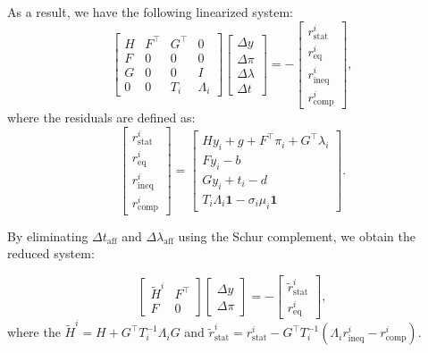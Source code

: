 \documentclass[conference]{IEEEtran}
\theoremstyle{plain}
\begin{document}
As a result, we have the following linearized system:
	\begin{equation}
		\begin{bmatrix}
		H & F^\top & G^\top & 0\\
		F & 0 & 0 & 0 \\
		G & 0 & 0 & I \\
		0 & 0 & T_i & \Lambda_i
		\end{bmatrix}
		\begin{bmatrix}
		\Delta y \\
		\Delta \pi \\
        \Delta \lambda \\
		\Delta t
		\end{bmatrix} = -
		\begin{bmatrix}
		r_{\mathrm{stat}}^i \\
		r_{\mathrm{eq}}^i \\
		r_{\mathrm{ineq}}^i \\
		r_{\mathrm{comp}}^i
		\end{bmatrix},
        \label{eq:IPM_KKT_system}
	\end{equation}
where the residuals are defined as:
\begin{equation}
        \begin{bmatrix}
		r_{\mathrm{stat}}^i \\
		r_{\mathrm{eq}}^i \\
		r_{\mathrm{ineq}}^i \\
		r_{\mathrm{comp}}^i
		\end{bmatrix}
        =
		\begin{bmatrix}
            Hy_i + g + F^\top \pi_i + G^\top \lambda_i \\
            Fy_i - b \\
            Gy_i + t_i - d \\
            T_i \Lambda_i \mathbf{1} - \sigma_i \mu_i \mathbf{1}
        \end{bmatrix}
        .
\end{equation}

By eliminating $\Delta t_\text{aff}$ and $\Delta \lambda_\text{aff}$ using the Schur complement, we obtain the reduced system:

\begin{equation}
    \begin{bmatrix}
    \tilde{H}^i & F^\top \\
    F & 0
    \end{bmatrix}
    \begin{bmatrix}
    \Delta y \\
    \Delta \pi
    \end{bmatrix} = -
    \begin{bmatrix}
    \tilde{r}_{\mathrm{stat}}^i \\
    r_{\mathrm{eq}}^i
    \end{bmatrix},
    \label{eq:schur_comp_KKT}
\end{equation}
where the $\tilde{H}^i = H + G^\top T_i^{-1}\Lambda_i G$ and $\tilde{r}_{\mathrm{stat}}^i = r_{\mathrm{stat}}^i - G^\top T_i^{-1} ( \Lambda_i r_{\mathrm{ineq}}^i - r_{\mathrm{comp}}^i )$.
\end{document}
